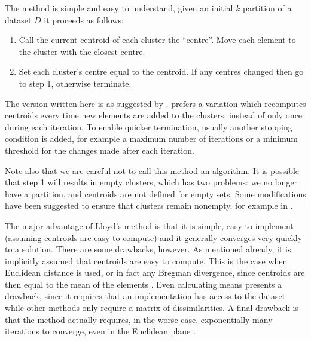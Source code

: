 \documentclass[a4paper]{report}
\newcommand{\dset}{D}
\begin{document}
The method is simple and easy to understand, given an initial $k$ partition of
a dataset $\dset$ it proceeds as follows:
\begin{enumerate}
\item Call the current centroid of each cluster the ``centre''.  Move each
  element to the cluster with the closest centre.
\item Set each cluster's centre equal to the centroid.  If any centres changed
  then go to step 1, otherwise terminate.
\end{enumerate}

The version written here is as suggested by \citet{ballhall67clustering}.
\citet{macqueen1967some} prefers a variation which recomputes centroids every
time new elements are added to the clusters, instead of only once during each
iteration.  To enable quicker termination, usually another stopping condition
is added, for example a maximum number of iterations or a minimum threshold
for the changes made after each iteration.

Note also that we are careful not to call this method an algorithm.  It is
possible that step 1 will results in empty clusters, which has two problems:
we no longer have a partition, and centroids are not defined for empty sets.
Some modifications have been suggested to ensure that clusters remain
nonempty, for example in \citep{pakhira2009modified}.

The major advantage of Lloyd's method is that it is simple, easy to implement
(assuming centroids are easy to compute) and it generally converges very
quickly to a solution.  There are some drawbacks, however.  As mentioned
already, it is implicitly assumed that centroids are easy to compute.  This is
the case when Euclidean distance is used, or in fact any Bregman divergence,
since centroids are then equal to the mean of the elements
\citep{telgarsky2010hartigan,banerjee2005clustering}.  Even calculating means
presents a drawback, since it requires that an implementation has access to
the dataset while other methods only require a matrix of dissimilarities.  A
final drawback is that the method actually requires, in the worse case,
exponentially many iterations to converge, even in the Euclidean plane
\citep{vattani2009exponential}.
\end{document}
